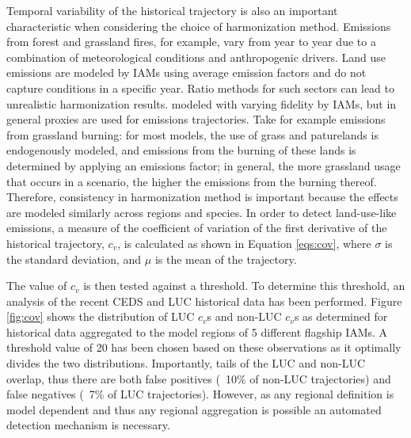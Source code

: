 Temporal variability of the historical trajectory is also an important characteristic
when considering the choice of harmonization method.  Emissions from forest and grassland fires, for example, vary from year to year due to a combination of meteorological conditions and anthropogenic drivers. Land use emissions are modeled by IAMs using average emission factors and do not capture conditions in a specific year.  Ratio methods for such sectors can lead to unrealistic harmonization results.
modeled with varying fidelity by IAMs, but in general proxies are used for
emissions trajectories. Take for example emissions from grassland burning: for
most models, the use of grass and paturelands is endogenously modeled, and
emissions from the burning of these lands is determined by applying an emissions
factor; in general, the more grassland usage that occurs in a scenario, the
higher the emissions from the burning thereof. Therefore, consistency in
harmonization method is important because the effects are modeled similarly
across regions and species. In order to detect land-use-like emissions,
% 
% 
% 
a measure of the coefficient of variation of the first derivative of the
historical trajectory, $c_v$, is calculated as shown in Equation \ref{eqs:cov},
where $\sigma$ is the standard deviation, and $\mu$ is the mean of the
trajectory.

The value of $c_v$ is then tested against a threshold. To determine this
threshold, an analysis of the recent CEDS and LUC historical data has been
performed. Figure \ref{fig:cov} shows the distribution of LUC $c_v$s and non-LUC
$c_v$s as determined for historical data aggregated to the model regions of 5
different flagship IAMs. A threshold value of 20 has been chosen based on these
observations as it optimally divides the two distributions. Importantly, tails
of the LUC and non-LUC overlap, thus there are both false positives (~10\% of
non-LUC trajectories) and false negatives (~7\% of LUC trajectories). However,
as any regional definition is model dependent and thus any regional aggregation
is possible an automated detection mechanism is necessary.

